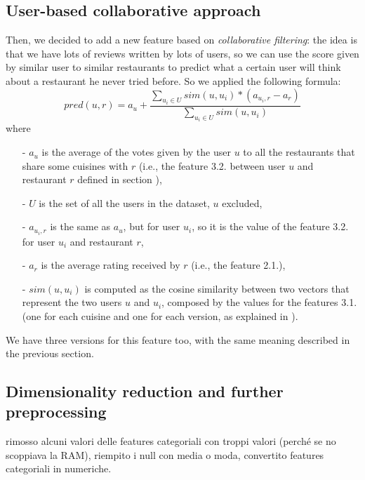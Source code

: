 \subsection{User-based collaborative approach}\label{sec:coll-appr}

Then, we decided to add a new feature based on \textit{collaborative filtering}: the idea is that we have lots of reviews written by lots of users, so we can use the score given by similar user to similar restaurants to predict what a certain user will think about a restaurant he never tried before.
So we applied the following formula:
\begin{equation}
    pred(u, r) = a_u + \frac{\sum_{u_i \in U} sim(u, u_i) * \left( a_{u_i, r} - a_r \right)} {\sum_{u_i \in U} sim(u, u_i)}
\end{equation}
where
\begin{itemize}
	\item[-] $a_u$ is the average of the votes given by the user $u$ to all the restaurants that share some cuisines with $r$ (i.e., the feature 3.2. between user $u$ and restaurant $r$ defined in section ),
	\item[-] $U$ is the set of all the users in the dataset, $u$ excluded,
	\item[-] $a_{u_i, r}$ is the same as $a_u$, but for user $u_i$, so it is the value of the feature 3.2. for user $u_i$ and restaurant $r$,
	\item[-] $a_r$ is the average rating received by $r$ (i.e., the feature 2.1.),
	\item[-] $sim(u, u_i)$ is computed as the cosine similarity between two vectors that represent the two users $u$ and $u_i$, composed by the values for the features 3.1. (one for each cuisine and one for each version, as explained in ).
\end{itemize}

We have three versions for this feature too, with the same meaning described in the previous section.

\subsection{Dimensionality reduction and further preprocessing}

rimosso alcuni valori delle features categoriali con troppi valori (perché se no scoppiava la RAM), riempito i null con media o moda, convertito features categoriali in numeriche.


